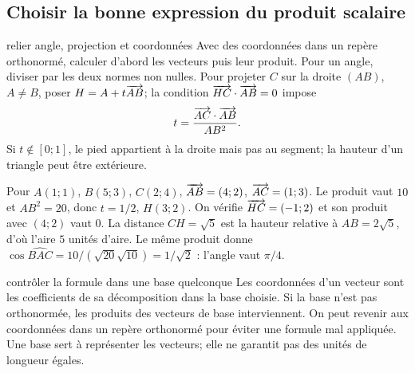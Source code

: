 
\subsection*{Choisir la bonne expression du produit scalaire}
\begin{methode}{relier angle, projection et coordonnées}
Avec des coordonnées dans un repère orthonormé, calculer d’abord les vecteurs puis leur produit. Pour un angle, diviser par les deux normes non nulles. Pour projeter $C$ sur la droite $(AB)$, $A\ne B$, poser $H=A+t\overrightarrow{AB}$; la condition $\overrightarrow{HC}\cdot\overrightarrow{AB}=0$ impose
\[
t=\frac{\overrightarrow{AC}\cdot\overrightarrow{AB}}{AB^2}.
\]
Si $t\notin[0;1]$, le pied appartient à la droite mais pas au segment; la hauteur d’un triangle peut être extérieure.
\end{methode}
\begin{exemple}
Pour $A(1;1)$, $B(5;3)$, $C(2;4)$, $\overrightarrow{AB}=(4;2)$, $\overrightarrow{AC}=(1;3)$. Le produit vaut $10$ et $AB^2=20$, donc $t=1/2$, $H(3;2)$. On vérifie $\overrightarrow{HC}=(-1;2)$ et son produit avec $(4;2)$ vaut $0$. La distance $CH=\sqrt5$ est la hauteur relative à $AB=2\sqrt5$, d’où l’aire $5$ unités d’aire. Le même produit donne $\cos\widehat{BAC}=10/(\sqrt{20}\sqrt{10})=1/\sqrt2$ : l’angle vaut $\pi/4$.
\end{exemple}
\begin{methode}{contrôler la formule dans une base quelconque}
Les coordonnées d’un vecteur sont les coefficients de sa décomposition dans la base choisie. Si la base n’est pas orthonormée, les produits des vecteurs de base interviennent. On peut revenir aux coordonnées dans un repère orthonormé pour éviter une formule mal appliquée. Une base sert à représenter les vecteurs; elle ne garantit pas des unités de longueur égales.
\end{methode}

